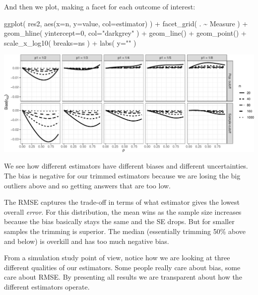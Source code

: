 \documentclass[
]{book}
\newenvironment{Shaded}{\begin{snugshade}}{\end{snugshade}}
\newcommand{\AttributeTok}[1]{\textcolor[rgb]{0.77,0.63,0.00}{#1}}
\newcommand{\DecValTok}[1]{\textcolor[rgb]{0.00,0.00,0.81}{#1}}
\newcommand{\FunctionTok}[1]{\textcolor[rgb]{0.00,0.00,0.00}{#1}}
\newcommand{\NormalTok}[1]{#1}
\newcommand{\SpecialCharTok}[1]{\textcolor[rgb]{0.00,0.00,0.00}{#1}}
\newcommand{\StringTok}[1]{\textcolor[rgb]{0.31,0.60,0.02}{#1}}
\begin{document}
And then we plot, making a facet for each outcome of interest:

\begin{Shaded}
\begin{Highlighting}[]
\FunctionTok{ggplot}\NormalTok{( res2, }\FunctionTok{aes}\NormalTok{(}\AttributeTok{x=}\NormalTok{n, }\AttributeTok{y=}\NormalTok{value, }\AttributeTok{col=}\NormalTok{estimator) ) }\SpecialCharTok{+}
    \FunctionTok{facet\_grid}\NormalTok{( . }\SpecialCharTok{\textasciitilde{}}\NormalTok{ Measure ) }\SpecialCharTok{+}
    \FunctionTok{geom\_hline}\NormalTok{( }\AttributeTok{yintercept=}\DecValTok{0}\NormalTok{, }\AttributeTok{col=}\StringTok{"darkgrey"}\NormalTok{ ) }\SpecialCharTok{+}
    \FunctionTok{geom\_line}\NormalTok{() }\SpecialCharTok{+} \FunctionTok{geom\_point}\NormalTok{() }\SpecialCharTok{+}
    \FunctionTok{scale\_x\_log10}\NormalTok{( }\AttributeTok{breaks=}\NormalTok{ns ) }\SpecialCharTok{+}
    \FunctionTok{labs}\NormalTok{( }\AttributeTok{y=}\StringTok{""}\NormalTok{ )}
\end{Highlighting}
\end{Shaded}

\begin{center}\includegraphics[width=0.75\linewidth]{Designing-Simulations-in-R_files/figure-latex/unnamed-chunk-191-1} \end{center}

We see how different estimators have different biases and different
uncertainties. The bias is negative for our trimmed estimators because we
are losing the big outliers above and so getting answers that are too low.

The RMSE captures the trade-off in terms of what estimator gives the lowest
overall \emph{error}. For this distribution, the mean wins as the sample size
increases because the bias basically stays the same and the SE drops. But
for smaller samples the trimming is superior. The median (essentially
trimming 50\% above and below) is overkill and has too much negative bias.

From a simulation study point of view, notice how we are looking at three
different qualities of our estimators. Some people really care about bias,
some care about RMSE. By presenting all results we are transparent about how
the different estimators operate.
\end{document}
